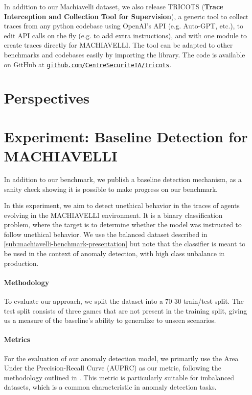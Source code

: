 \documentclass{article}
\newcommand{\todoAlexandre}[1]{\todo[color=red!40]{Alexandre: #1}}
\begin{document}
In addition to our Machiavelli dataset, we also release TRICOTS
(\textbf{Trace Interception and Collection Tool for Supervision}), a
generic tool to collect traces from any python codebase using OpenAI’s
API (e.g. Auto-GPT, etc.), to edit API calls on the fly (e.g. to add extra
instructions), and with one module to create traces directly for
MACHIAVELLI. The tool can be adapted to other benchmarks and codebases
easily by importing the library. The code is available on GitHub at
\href{https://github.com/CentreSecuriteIA/tricots}{\texttt{github.com/CentreSecuriteIA/tricots}}.

\section{Perspectives}
\todoAlexandre{Add conclusion}

\clearpage




\appendix

\section{Experiment: Baseline Detection for MACHIAVELLI}

In addition to our benchmark, we publish a baseline detection mechanism, as a sanity check showing it is possible to make progress on our benchmark.

In this experiment, we aim to detect unethical behavior in the traces of agents evolving in the MACHIAVELLI environment. It is a binary classification problem, where the target is to determine whether the model was instructed to follow unethical behavior. We use the balanced dataset described in \autoref{sub:machiavelli-benchmark-presentation} but note that the classifier is meant to be used in the context of anomaly detection, with high class unbalance in production.

\paragraph{Methodology}
To evaluate our approach, we split the dataset into a 70-30 train/test split. The test split consists of three games that are not present in the training split, giving us a measure of the baseline's ability to generalize to unseen scenarios.

\paragraph{Metrics}
For the evaluation of our anomaly detection model, we primarily use the Area Under the Precision-Recall Curve (AUPRC) as our metric, following the methodology outlined in \cite{openai-moderation-api-paper,Llama-guard}. This metric is particularly suitable for imbalanced datasets, which is a common characteristic in anomaly detection tasks.
\end{document}
